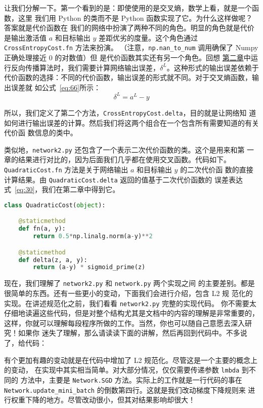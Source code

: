 让我们分解一下。第一个看到的是：即使使用的是交叉熵，数学上看，就是一个函数，这里
我们用 Python 的类而不是 Python 函数实现了它。为什么这样做呢？答案就是代价函数在
我们的网络中扮演了两种不同的角色。明显的角色就是代价是输出激活值 $a$ 和目标输出
$y$ 差距优劣的度量。这个角色通过 \lstinline!CrossEntropyCost.fn! 方法来扮演。
（注意，\lstinline!np.nan_to_num! 调用确保了 Numpy 正确处理接近 $0$ 的对数值）但
是代价函数其实还有另一个角色。回想%
\hyperref[sec:the_four_fundamental_equations_behind_backpropagation]{第二章}中运
行反向传播算法时，我们需要计算网络输出误差，$\delta^L$。这种形式的输出误差依赖于
代价函数的选择：不同的代价函数，输出误差的形式就不同。对于交叉熵函数，输出误差就
如公式~\eqref{eq:66}所示：
\begin{equation}
  \delta^L = a^L-y
  \label{eq:99}\tag{99}
\end{equation}

所以，我们定义了第二个方法，\lstinline!CrossEntropyCost.delta!，目的就是让网络知
道如何进行输出误差的计算。然后我们将这两个组合在一个包含所有需要知道的有关代价函
数信息的类中。

类似地，\lstinline!network2.py! 还包含了一个表示二次代价函数的类。这个是用来和第
一章的结果进行对比的，因为后面我们几乎都在使用交叉函数。代码如下。
\lstinline!QuadraticCost.fn! 方法是关于网络输出 $a$ 和目标输出 $y$ 的二次代价函
数的直接计算结果。由 \lstinline!QuadraticCost.delta! 返回的值基于二次代价函数的
误差表达式~\eqref{eq:30}，我们在第二章中得到它。
\begin{lstlisting}[language=Python]
class QuadraticCost(object):

    @staticmethod
    def fn(a, y):
        return 0.5*np.linalg.norm(a-y)**2

    @staticmethod
    def delta(z, a, y):
        return (a-y) * sigmoid_prime(z)
\end{lstlisting}

现在，我们理解了 \lstinline!network2.py! 和 \lstinline!network.py! 两个实现之间
的主要差别。都是很简单的东西。还有一些更小的变动，下面我们会进行介绍，包含 L2 规
范化的实现。在讲述规范化之前，我们看看 \lstinline!network2.py! 完整的实现代码。
你不需要太仔细地读遍这些代码，但是对整个结构尤其是文档中的内容的理解是非常重要的，
这样，你就可以理解每段程序所做的工作。当然，你也可以随自己意愿去深入研究！如果你
迷失了理解，那么请读读下面的讲解，然后再回到代码中。不多说了，给代码：



有个更加有趣的变动就是在代码中增加了 L2 规范化。尽管这是一个主要的概念上的变动，
在实现中其实相当简单。对大部分情况，仅仅需要传递参数 \lstinline!lmbda! 到不同的
方法中，主要是 \lstinline!Network.SGD! 方法。实际上的工作就是一行代码的事在
\lstinline!Network.update_mini_batch! 的倒数第四行。这就是我们改动梯度下降规则来
进行权重下降的地方。尽管改动很小，但其对结果影响却很大！

